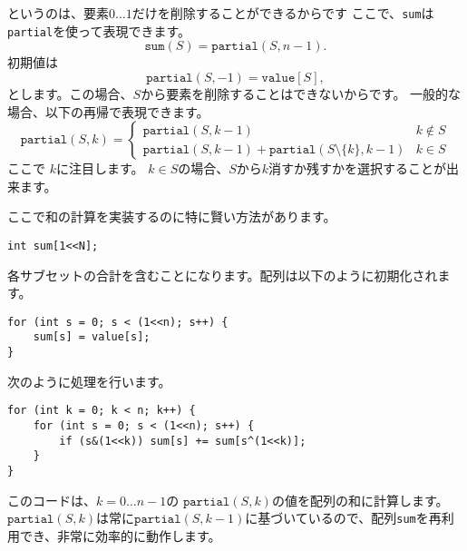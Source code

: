 というのは、要素$0 \ldots 1$だけを削除することができるからです
ここで、\texttt{sum}は\texttt{partial}を使って表現できます。
\[\texttt{sum}(S) = \texttt{partial}(S,n-1).\]
初期値は
\[\texttt{partial}(S,-1)=\texttt{value}[S],\]
とします。この場合、$S$から要素を削除することはできないからです。
一般的な場合、以下の再帰で表現できます。
\begin{equation*}
    \texttt{partial}(S,k) = \begin{cases}
               \texttt{partial}(S,k-1) & k \notin S \\
               \texttt{partial}(S,k-1) + \texttt{partial}(S \setminus \{k\},k-1) & k \in S
           \end{cases}
\end{equation*}
ここで $k$に注目します。
 $k \in S$の場合、$S$から$k$消すか残すかを選択することが出来ます。

ここで和の計算を実装するのに特に賢い方法があります。
\begin{lstlisting}
int sum[1<<N];
\end{lstlisting}
各サブセットの合計を含むことになります。配列は以下のように初期化されます。
\begin{lstlisting}
for (int s = 0; s < (1<<n); s++) {
    sum[s] = value[s];
}
\end{lstlisting}
次のように処理を行います。
\begin{lstlisting}
for (int k = 0; k < n; k++) {
    for (int s = 0; s < (1<<n); s++) {
        if (s&(1<<k)) sum[s] += sum[s^(1<<k)];
    }
}
\end{lstlisting}
このコードは、$k=0 \ldots n-1$の
$\texttt{partial}(S,k)$の値を配列の和に計算します。
$\texttt{partial}(S,k)$は常に$\texttt{partial}(S,k-1)$に基づいているので、配列\texttt{sum}を再利用でき、非常に効率的に動作します。
